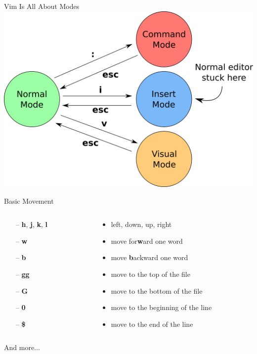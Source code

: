 \documentclass{beamer}
\begin{document}
\begin{frame}{Vim Is All About Modes}
    \includegraphics[width=1\textwidth]{images/vim-modes-keys.png}
\end{frame}

\begin{frame}{Basic Movement}
    \begin{columns}
        \begin{column}{0.2\textwidth}
            \begin{itemize}
                \item[--] \textbf{h}, \textbf{j}, \textbf{k}, \textbf{l}
                \item[--] \textbf{w}
                \item[--] \textbf{b}
                \item[--] \textbf{gg}
                \item[--] \textbf{G}
                \item[--] \textbf{0}
                \item[--] \textbf{\$}
            \end{itemize}
        \end{column}
        \begin{column}{0.8\textwidth}
            \begin{itemize}
                \item left, down, up, right
                \item move for\textbf{w}ard one word
                \item move \textbf{b}ackward one word
                \item move to the top of the file
                \item move to the bottom of the file
                \item move to the beginning of the line
                \item move to the end of the line
            \end{itemize}
        \end{column}
    \end{columns}
    \begin{center}
        \large And more...
    \end{center}
\end{frame}
\end{document}
